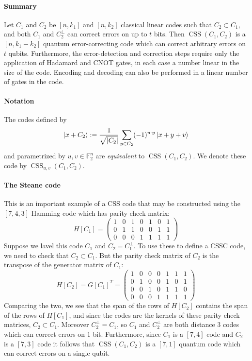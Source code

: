 \documentclass[11pt,a4paper]{article}
\theoremstyle{definition}
\theoremstyle{plain}
\theoremstyle{remark}
\begin{document}
\paragraph{Summary} 
Let $C_1$ and $C_2$ be $[n, k_1]$ and $[n, k_2]$ classical linear codes such that $C_2 \subset C_1$, and both $C_1$ and $C_2^\perp$ can correct errors on up to $t$ bits. 
Then $\operatorname{CSS}(C_1, C_2)$ is a $[n, k_1 - k_2]$ quantum error-correcting code which can correct arbitrary errors on $t$ qubits. 
Furthermore, the error-detection and correction steps require only the application of Hadamard and CNOT gates, in each case a number linear in the size of the code. Encoding and decoding can also be performed in a linear number 
of gates in the code. 

\paragraph{Notation} 
The codes defined by 
$$\ket{x + C_2} := \frac{1}{\sqrt{|C_2|}} \sum_{y \in C_2} (-1)^{u \cdot y} \ket{x + y + v}$$
and parametrized by $u, v \in \mathbb{F}_2^n$ are \emph{equivalent} to $\operatorname{CSS}(C_1, C_2)$. 
We denote these code by $\operatorname{CSS}_{u, v}(C_1, C_2)$. 

\paragraph{The Steane code} This is an important example of a CSS code that may be constructed using the $[7, 4,3]$ Hamming code which has parity check matrix:
\[
H[C_1] = \begin{pmatrix}
1 & 0 & 1 & 0 & 1 & 0 & 1 \\
0 & 1 & 1 & 0 & 0 & 1 & 1 \\
0 & 0 & 0 & 1 & 1 & 1 & 1
\end{pmatrix}
\]
Suppose we lavel this code $C_1$ and $C_2 = C_1^\perp$. To use these to define a CSSC code, we need to check that $C_2 \subset C_1$. 
But the parity check matrix of $C_2$ is the transpose of the generator matrix of $C_1$: 
\[
H[C_2] = G[C_1]^T =
\begin{pmatrix}
1 & 0 & 0 & 0 & 1 & 1 & 1\\
0 & 1 & 0 & 0 & 1 & 0 & 1\\
0 & 0 & 1 & 0 & 1 & 1 & 0\\
0 & 0 & 0 & 1 & 1 & 1 & 1
\end{pmatrix}
\]
Comparing the two, we see that the span of the rows of $H[C_2]$ contains the span of the rows of $H[C_1]$, 
and since the codes are the kernels of these parity check matrices, $C_2 \subset C_1$. Moreover $C_2^\perp = C_1$, so $C_1$ and $C_2^\perp$ 
are both distance $3$ codes which can correct errors on $1$ bit. 
Furthermore, since $C_1$ is a $[7, 4]$ code and $C_2$ is a $[7,3]$ code it follows that $\operatorname{CSS}(C_1, C_2)$ is a $[7,1]$ quantum code 
which can correct errors on a single qubit. 
\end{document}
